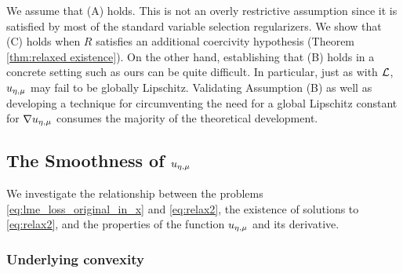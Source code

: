 \noindent
We assume that (A) holds. This is not an overly
restrictive assumption since it is satisfied by most of the standard
variable selection regularizers.
We show that (C) holds when $R$ satisfies
an additional coercivity hypothesis (Theorem \ref{thm:relaxed existence}). 
On the other hand, establishing that (B) holds
in a concrete setting such as ours
can be quite difficult. 
In particular, just as with $\operatorname{\mathcal{L}}$, ${u_{\eta,\mu}}$ may fail to be globally Lipschitz.
Validating Assumption (B) as well as developing a technique for circumventing
the need for a global Lipschitz constant for $\nabla{u_{\eta,\mu}}$ 
consumes the majority of the theoretical development. 



\subsection{The Smoothness of $u_{\eta,\mu}$}\label{sec:smoothness}
We investigate the relationship between the problems \eqref{eq:lme_loss_original_in_x}
and \eqref{eq:relax2}, the existence of solutions to 
 \eqref{eq:relax2}, and the properties of the function ${u_{\eta,\mu}}$ and its derivative.

\subsubsection{Underlying convexity}


